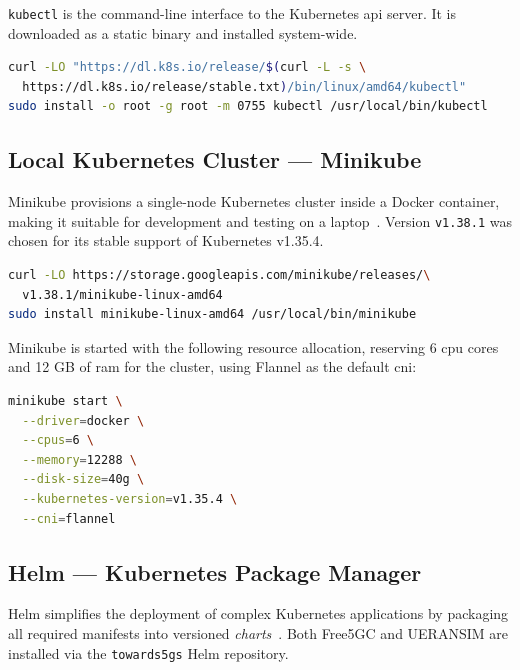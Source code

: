 \texttt{kubectl} is the command-line interface to the Kubernetes \gls{api} server. It is downloaded as a static binary and installed system-wide.

\begin{lstlisting}[language=bash, caption={Downloading and installing kubectl}, label={lst:kubectl_install}]
curl -LO "https://dl.k8s.io/release/$(curl -L -s \
  https://dl.k8s.io/release/stable.txt)/bin/linux/amd64/kubectl"
sudo install -o root -g root -m 0755 kubectl /usr/local/bin/kubectl
\end{lstlisting}

\subsection{Local Kubernetes Cluster — Minikube}

Minikube provisions a single-node Kubernetes cluster inside a Docker container, making it suitable for development and testing on a laptop~\cite{minikube}. Version \texttt{v1.38.1} was chosen for its stable support of Kubernetes v1.35.4.

\begin{lstlisting}[language=bash, caption={Installing Minikube v1.38.1}, label={lst:minikube_install}]
curl -LO https://storage.googleapis.com/minikube/releases/\
  v1.38.1/minikube-linux-amd64
sudo install minikube-linux-amd64 /usr/local/bin/minikube
\end{lstlisting}

Minikube is started with the following resource allocation, reserving 6 \gls{cpu} cores and 12 GB of \gls{ram} for the cluster, using Flannel as the default \gls{cni}:

\begin{lstlisting}[language=bash, caption={Starting Minikube with resource allocation (start-minikube.sh)}, label={lst:minikube_start}]
minikube start \
  --driver=docker \
  --cpus=6 \
  --memory=12288 \
  --disk-size=40g \
  --kubernetes-version=v1.35.4 \
  --cni=flannel
\end{lstlisting}

\subsection{Helm — Kubernetes Package Manager}

Helm simplifies the deployment of complex Kubernetes applications by packaging all required manifests into versioned \emph{charts}~\cite{helm}. Both Free5GC and UERANSIM are installed via the \texttt{towards5gs} Helm repository.

